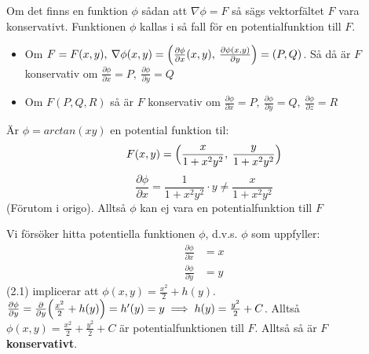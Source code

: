 \documentclass{report}
\begin{document}
\vspace{20pt}

{
Om det finns en funktion $ \phi $ sådan att $ \nabla\phi = F $ så sägs vektorfältet $ F $ vara konservativt. Funktionen $ \phi $ kallas i så fall för en potentialfunktion till $ F $. 

\begin{itemize}
	\item Om $ F = F(x,y), \: \nabla\phi (x,y) = \Bigl( \frac{\partial \phi}{\partial x}(x,y), \: \frac{\partial \phi(x,y)}{\partial y} \Bigr) = (P,Q)$. Så då är $ F $ konservativ om $ \frac{\partial \phi}{\partial x} = P, \: \frac{\partial \phi}{\partial y} = Q $
	\item Om $ F(P, Q,R)  $ så är $ F $ konservativ om $ \frac{\partial \phi}{\partial x} = P, \: \frac{\partial \phi}{\partial y} = Q, \: \frac{\partial \phi}{\partial z} = R$ 
\end{itemize}
}

\ex{}
{
Är $ \phi = arctan(xy) $ en potential funktion til:
\begin{equation*}
F(x,y) = \Bigl( \frac{x}{1+x^2y^2} , \: \frac{y}{1+x^2y^2}   \Bigr)
\end{equation*}
\begin{equation*}
\frac{\partial \phi}{\partial x} = \frac{1}{1+x^2y^2} \cdot y \ne \frac{x}{1+x^2y^2} 
\end{equation*}
(Förutom i origo). Alltså $ \phi $ kan ej vara en potentialfunktion till $ F $
}

{
	Vi försöker hitta potentiella funktionen $ \phi $, d.v.s. $ \phi $ som uppfyller:
\begin{align}
		\frac{\partial \phi}{\partial x} &= x\\
	\frac{\partial \phi}{\partial y} &= y
\end{align}
(2.1) implicerar att $ \phi (x,y) = \frac{x^2}{2} + h(y) $. $ \frac{\partial \phi}{\partial y} = \frac{\partial}{\partial y} \Bigl( \frac{x^2}{2} + h(y) \Bigr)  = h'(y) = y \implies h(y) = \frac{y^2}{2} + C$. Alltså $ \phi (x,y) = \frac{x^2}{2} + \frac{y^2}{2} +C $ är potentialfunktionen till $ F $. Alltså så är $ F $ \textbf{konservativt}.   
}

\end{document}
